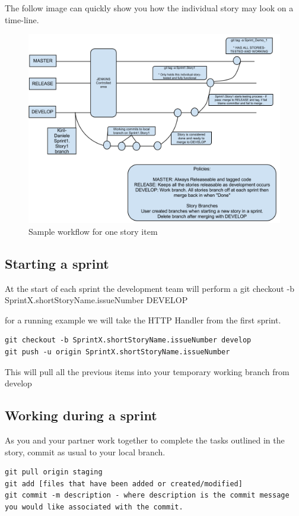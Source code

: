 \documentclass[11pt]{report}
\begin{document}
The follow image can quickly show you how the individual story may look on a time-line.
\begin{figure}[htb]
\centering
\includegraphics[width=1\textwidth]{workflow}
\caption{Sample workflow for one story item}
\label{fig:architecture}
\end{figure}


\subsection{Starting a sprint}

At the start of each sprint the development team will perform a git checkout -b SprintX.shortStoryName.issueNumber DEVELOP

for a running example we will take the HTTP Handler from the first sprint. 
\begin{verbatim}
git checkout -b SprintX.shortStoryName.issueNumber develop
git push -u origin SprintX.shortStoryName.issueNumber
\end{verbatim}
This will pull all the previous items into your temporary working branch from develop

\subsection{Working during a sprint}

As you and your partner work together to complete the tasks outlined in the story, commit as usual to your local branch.\\
\begin{verbatim}
git pull origin staging
git add [files that have been added or created/modified]
git commit -m description - where description is the commit message you would like associated with the commit. 
\end{verbatim}
\end{document}
